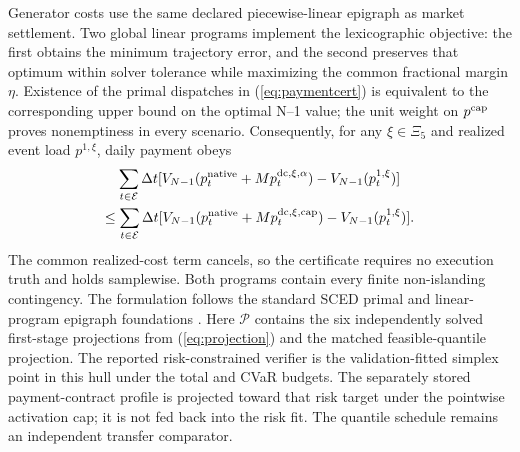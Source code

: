 \documentclass[10pt,journal]{IEEEtran}
\newcommand{\RiskSafe}{risk-constrained verifier}
\newcommand{\dt}{\Delta t}
\begin{document}
Generator costs use the same declared piecewise-linear epigraph as market
settlement. Two global linear programs implement the lexicographic objective:
the first obtains the minimum trajectory error, and the second preserves that
optimum within solver tolerance while maximizing the common fractional margin
$\eta$. Existence of the primal dispatches in (\ref{eq:paymentcert}) is
equivalent to the corresponding upper bound on the optimal N--1 value; the
unit weight on $p^{\rm cap}$ proves nonemptiness in every scenario.
Consequently, for any $\xi\in\Xi_5$ and realized event load $p^{1,\xi}$,
daily payment obeys
\begin{multline}
\sum_{t\in\mathcal E}\dt
[V_{N-1}(p_t^{\rm native}+M p_t^{\rm dc,\xi,\alpha})
-V_{N-1}(p^{1,\xi}_t)]\\
\leq\sum_{t\in\mathcal E}\dt
[V_{N-1}(p_t^{\rm native}+M p_t^{\rm dc,\xi,cap})
-V_{N-1}(p^{1,\xi}_t)].
\label{eq:paymentdominance}
\end{multline}
The common realized-cost term cancels, so the certificate requires no
execution truth and holds samplewise. Both programs contain every finite
non-islanding contingency. The formulation follows the
standard SCED primal and linear-program epigraph foundations
\cite{zimmerman2011matpower,boyd2004convex}.
Here $\mathcal P$ contains the six independently solved first-stage
projections from (\ref{eq:projection}) and the matched feasible-quantile
projection. The reported \RiskSafe{} is the validation-fitted simplex point in
this hull under the total and CVaR budgets. The separately stored
payment-contract profile is projected toward that risk target under the
pointwise activation cap; it is not fed back into the risk fit. The quantile
schedule remains an independent transfer comparator.
\end{document}
